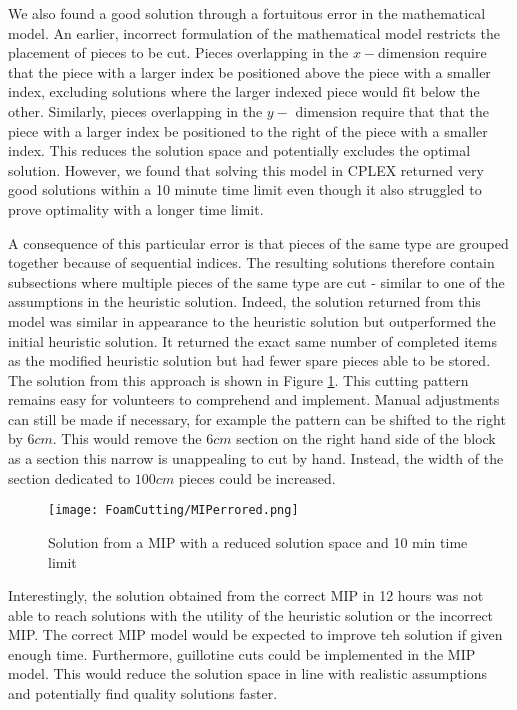\documentclass[10pt,a4paper]{article}
\begin{document}
We also found a good solution through a fortuitous error in the mathematical model. An earlier, incorrect formulation of the mathematical model restricts the placement of pieces to be cut. Pieces overlapping in the $x-$dimension require that the piece with a larger index be positioned above the piece with a smaller index, excluding solutions where the larger indexed piece would fit below the other. Similarly, pieces overlapping in the $y-$ dimension require that that the piece with a larger index be positioned to the right of the piece with a smaller index. This reduces the solution space and potentially excludes the optimal solution. However, we found that solving this model in CPLEX returned very good solutions within a 10 minute time limit even though it also struggled to prove optimality with a longer time limit.

A consequence of this particular error is that pieces of the same type are grouped together because of sequential indices. The resulting solutions therefore contain subsections where multiple pieces of the same type are cut - similar to one of the assumptions in the heuristic solution.  Indeed, the solution returned from this model was similar in appearance to the heuristic solution but outperformed the initial heuristic solution. It returned the exact same number of completed items as the modified heuristic solution but had fewer spare pieces able to be stored. The solution from this approach is shown in Figure \ref{fig:MIPerror}. This cutting pattern remains easy for volunteers to comprehend and implement. Manual adjustments can still be made if necessary, for example the pattern can be shifted to the right by $6cm$. This would remove the $6cm$ section on the right hand side of the block as a section this narrow is unappealing to cut by hand. Instead, the width of the section dedicated to $100cm$ pieces could be increased.

\begin{figure}
\centering
\texttt{[image: FoamCutting/MIPerrored.png]} 
\caption{Solution from a MIP with a reduced solution space and 10 min time limit}
\label{fig:MIPerror}
\end{figure}

Interestingly, the solution obtained from the correct MIP in 12 hours was not able to reach solutions with the utility of the heuristic solution or the incorrect MIP. The correct MIP model would be expected to improve teh solution if given enough time. Furthermore, guillotine cuts could be implemented in the MIP model. This would reduce the solution space in line with realistic assumptions and potentially find quality solutions faster.
\end{document}
